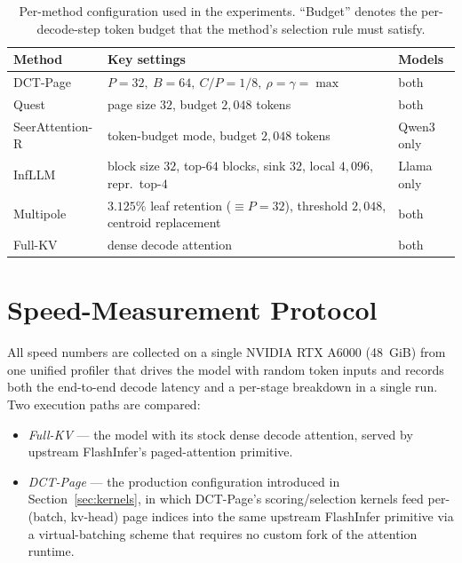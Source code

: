 \begin{table}[ht]
  \centering
  \caption[Per-method configuration used in the experiments.]
  {Per-method configuration used in the experiments.  ``Budget''
   denotes the per-decode-step token budget that the method's
   selection rule must satisfy.}
  \label{tab:baseline-config}
  \small
  \begin{tabular}{l p{} l}
    \toprule
    Method            & Key settings                                      & Models \\
    \midrule
    DCT-Page          & $P{=}32,\ B{=}64,\ C/P{=}1/8,\ \rho{=}\gamma{=}\max$ & both \\
    Quest             & page size $32$, budget $2{,}048$ tokens           & both \\
    SeerAttention-R   & token-budget mode, budget $2{,}048$ tokens        & Qwen3 only \\
    InfLLM            & block size $32$, top-$64$ blocks, sink $32$,
                        local $4{,}096$, repr.\ top-$4$                   & Llama only \\
    Multipole         & $3.125\%$ leaf retention ($\equiv P{=}32$),
                        threshold $2{,}048$, centroid replacement         & both \\
    Full-KV           & dense decode attention                            & both \\
    \bottomrule
  \end{tabular}
\end{table}


\section{Speed-Measurement Protocol}\label{sec:speed-protocol}

All speed numbers are collected on a single NVIDIA RTX A6000 (48~GiB)
from one unified profiler that drives the model with random
token inputs and records both the end-to-end decode latency and a
per-stage breakdown in a single run.  Two execution paths are
compared:

\begin{itemize}
  \item \emph{Full-KV} --- the model with its stock dense decode
        attention, served by upstream FlashInfer's paged-attention
        primitive.
  \item \emph{DCT-Page} --- the production configuration introduced
        in Section~\ref{sec:kernels}, in which DCT-Page's
        scoring/selection kernels feed per-(batch, kv-head) page
        indices into the same upstream FlashInfer primitive via a
        virtual-batching scheme that requires no custom fork of the
        attention runtime.
\end{itemize}

